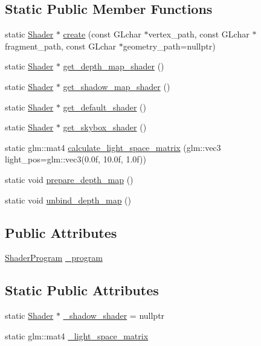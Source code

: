 \subsection*{Static Public Member Functions}
\begin{DoxyCompactItemize}
\item 
static \hyperlink{classLarp_1_1Shader}{Shader} $\ast$ \hyperlink{classLarp_1_1Shader_a3ab41a2fce5930bccd49b16fd8ed78e6}{create} (const G\+Lchar $\ast$vertex\+\_\+path, const G\+Lchar $\ast$fragment\+\_\+path, const G\+Lchar $\ast$geometry\+\_\+path=nullptr)
\item 
static \hyperlink{classLarp_1_1Shader}{Shader} $\ast$ \hyperlink{classLarp_1_1Shader_a33e1a8ceb4d842f133b2ed8b7483ab0d}{get\+\_\+depth\+\_\+map\+\_\+shader} ()
\item 
static \hyperlink{classLarp_1_1Shader}{Shader} $\ast$ \hyperlink{classLarp_1_1Shader_addbcdb32c69a7d86ed6a2e05bfd9f7e7}{get\+\_\+shadow\+\_\+map\+\_\+shader} ()
\item 
static \hyperlink{classLarp_1_1Shader}{Shader} $\ast$ \hyperlink{classLarp_1_1Shader_a413331f3e3f59cf9acc669cede815796}{get\+\_\+default\+\_\+shader} ()
\item 
static \hyperlink{classLarp_1_1Shader}{Shader} $\ast$ \hyperlink{classLarp_1_1Shader_af758bd48a5fa70b43b185b338ea229e5}{get\+\_\+skybox\+\_\+shader} ()
\item 
static glm\+::mat4 \hyperlink{classLarp_1_1Shader_ae96429003c78a449f8e65934e4467e06}{calculate\+\_\+light\+\_\+space\+\_\+matrix} (glm\+::vec3 light\+\_\+pos=glm\+::vec3(0.\+0f, 10.\+0f, 1.\+0f))
\item 
static void \hyperlink{classLarp_1_1Shader_a864996032f94b7fb73920360946abe31}{prepare\+\_\+depth\+\_\+map} ()
\item 
static void \hyperlink{classLarp_1_1Shader_a9becae99130655c5c0b25397330cfe98}{unbind\+\_\+depth\+\_\+map} ()
\end{DoxyCompactItemize}
\subsection*{Public Attributes}
\begin{DoxyCompactItemize}
\item 
\hyperlink{namespaceLarp_a9b24f5785486fc97891b6c8148d80953}{Shader\+Program} \hyperlink{classLarp_1_1Shader_a52ce34a36709f400ddf50c4398d6f0ed}{\+\_\+program}
\end{DoxyCompactItemize}
\subsection*{Static Public Attributes}
\begin{DoxyCompactItemize}
\item 
static \hyperlink{classLarp_1_1Shader}{Shader} $\ast$ \hyperlink{classLarp_1_1Shader_ae3c817c27c61ba0bf96215cf91c7df4f}{\+\_\+shadow\+\_\+shader} = nullptr
\item 
static glm\+::mat4 \hyperlink{classLarp_1_1Shader_ac69a7f559f52fa6cda07a0f782608af7}{\+\_\+light\+\_\+space\+\_\+matrix}
\end{DoxyCompactItemize}
